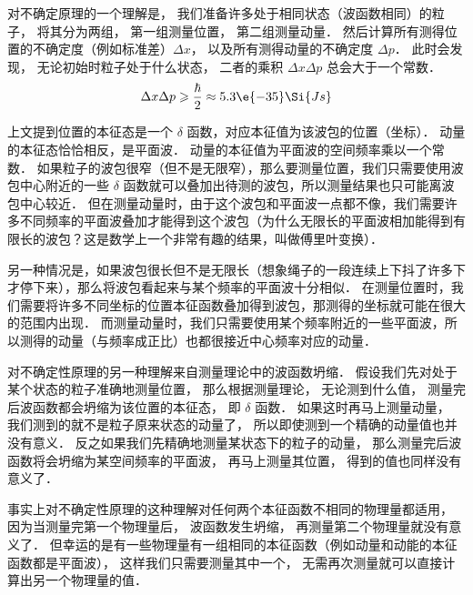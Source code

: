 对不确定原理的一个理解是， 我们准备许多处于相同状态（波函数相同）的粒子， 将其分为两组， 第一组测量位置， 第二组测量动量． 然后计算所有测得位置的不确定度（例如标准差）$\Delta x$， 以及所有测得动量的不确定度 $\Delta p$． 此时会发现， 无论初始时粒子处于什么状态， 二者的乘积 $\Delta x \Delta p$ 总会大于一个常数．
\begin{equation}
\Delta x \Delta p \geqslant \frac{\hbar}{2} \approx 5.3\e{-35} \Si{Js}
\end{equation}

上文提到位置的本征态是一个 $\delta$ 函数，对应本征值为该波包的位置（坐标）． 动量的本征态恰恰相反，是平面波． 动量的本征值为平面波的空间频率乘以一个常数． 如果粒子的波包很窄（但不是无限窄），那么要测量位置，我们只需要使用波包中心附近的一些 $\delta$ 函数就可以叠加出待测的波包，所以测量结果也只可能离波包中心较近． 但在测量动量时，由于这个波包和平面波一点都不像，我们需要许多不同频率的平面波叠加才能得到这个波包（为什么无限长的平面波相加能得到有限长的波包？这是数学上一个非常有趣的结果，叫做傅里叶变换）．

另一种情况是，如果波包很长但不是无限长（想象绳子的一段连续上下抖了许多下才停下来），那么将波包看起来与某个频率的平面波十分相似． 在测量位置时，我们需要将许多不同坐标的位置本征函数叠加得到波包，那测得的坐标就可能在很大的范围内出现． 而测量动量时，我们只需要使用某个频率附近的一些平面波，所以测得的动量（与频率成正比）也都很接近中心频率对应的动量．

对不确定性原理的另一种理解来自测量理论中的波函数坍缩． 假设我们先对处于某个状态的粒子准确地测量位置， 那么根据测量理论， 无论测到什么值， 测量完后波函数都会坍缩为该位置的本征态， 即 $\delta$ 函数． 如果这时再马上测量动量， 我们测到的就不是粒子原来状态的动量了， 所以即使测到一个精确的动量值也并没有意义． 反之如果我们先精确地测量某状态下的粒子的动量， 那么测量完后波函数将会坍缩为某空间频率的平面波， 再马上测量其位置， 得到的值也同样没有意义了．

事实上对不确定性原理的这种理解对任何两个本征函数不相同的物理量都适用， 因为当测量完第一个物理量后， 波函数发生坍缩， 再测量第二个物理量就没有意义了． 但幸运的是有一些物理量有一组相同的本征函数（例如动量和动能的本征函数都是平面波）， 这样我们只需要测量其中一个， 无需再次测量就可以直接计算出另一个物理量的值．
